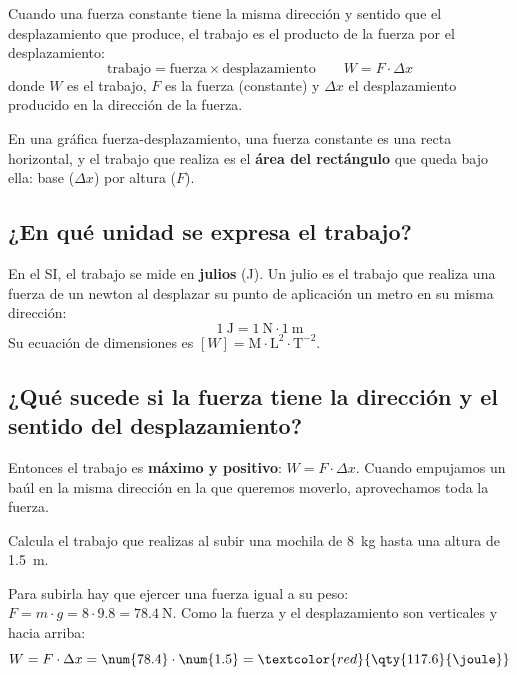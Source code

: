 Cuando una fuerza constante tiene la misma dirección y sentido que el desplazamiento que produce, el trabajo es el producto de la fuerza por el desplazamiento:
\[ \text{trabajo} = \text{fuerza} \times \text{desplazamiento} \qquad W = F \cdot \Delta x \]
donde \(W\) es el trabajo, \(F\) es la fuerza (constante) y \(\Delta x\) el desplazamiento producido en la dirección de la fuerza.

En una gráfica fuerza-desplazamiento, una fuerza constante es una recta horizontal, y el trabajo que realiza es el \textbf{área del rectángulo} que queda bajo ella: base (\(\Delta x\)) por altura (\(F\)).

\begin{center}
\end{center}

\subsection{¿En qué unidad se expresa el trabajo?}

En el SI, el trabajo se mide en \textbf{julios} (\unit{\joule}). Un julio es el trabajo que realiza una fuerza de un newton al desplazar su punto de aplicación un metro en su misma dirección:
\[ \qty{1}{\joule} = \qty{1}{\newton} \cdot \qty{1}{\m} \]
Su ecuación de dimensiones es \([W] = \mathrm{M \cdot L^2 \cdot T^{-2}}\).

\subsection{¿Qué sucede si la fuerza tiene la dirección y el sentido del desplazamiento?}

Entonces el trabajo es \textbf{máximo y positivo}: \(W = F \cdot \Delta x\). Cuando empujamos un baúl en la misma dirección en la que queremos moverlo, aprovechamos toda la fuerza.

\begin{example}
    Calcula el trabajo que realizas al subir una mochila de \qty{8}{\kg} hasta una altura de \qty{1.5}{\m}.

    Para subirla hay que ejercer una fuerza igual a su peso: \(F = m \cdot g = 8 \cdot \num{9.8} = \qty{78.4}{\newton}\). Como la fuerza y el desplazamiento son verticales y hacia arriba:
    \[ W = F \cdot \Delta x = \num{78.4} \cdot \num{1.5} = \textcolor{red}{\qty{117.6}{\joule}} \]
\end{example}

